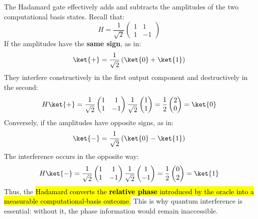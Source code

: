 \highspace
The Hadamard gate effectively adds and subtracts the amplitudes of the two computational basis states. Recall that:
\begin{equation*}
    H = \frac{1}{\sqrt{2}}\begin{pmatrix}
        1 & 1 \\
        1 & -1
    \end{pmatrix}
\end{equation*}
If the amplitudes have the \textbf{same sign}, as in:
\begin{equation*}
    \ket{+} = \frac{1}{\sqrt{2}}\left(\ket{0} + \ket{1}\right)
\end{equation*}
They interfere constructively in the first output component and destructively in the second:
\begin{equation*}
    H\ket{+} = \frac{1}{\sqrt{2}}\begin{pmatrix}
        1 & 1 \\
        1 & -1
    \end{pmatrix}\frac{1}{\sqrt{2}}\begin{pmatrix}
        1 \\
        1
    \end{pmatrix} = \frac{1}{2}\begin{pmatrix}
        2 \\
        0
    \end{pmatrix} = \ket{0}
\end{equation*}
Conversely, if the amplitudes have opposite signs, as in:
\begin{equation*}
    \ket{-} = \frac{1}{\sqrt{2}}\left(\ket{0} - \ket{1}\right)
\end{equation*}
The interference occurs in the opposite way:
\begin{equation*}
    H\ket{-} = \frac{1}{\sqrt{2}}\begin{pmatrix}
        1 & 1 \\
        1 & -1
    \end{pmatrix}\frac{1}{\sqrt{2}}\begin{pmatrix}
        1 \\
        -1
    \end{pmatrix} = \frac{1}{2}\begin{pmatrix}
        0 \\
        2
    \end{pmatrix} = \ket{1}
\end{equation*}
Thus, the \hl{Hadamard converts the \textbf{relative phase} introduced by the oracle into a measurable computational-basis outcome.} This is why quantum interference is essential: without it, the phase information would remain inaccessible.

